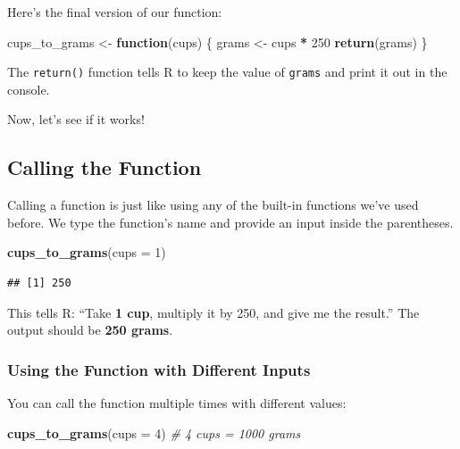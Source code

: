 \documentclass[
]{book}
\newenvironment{Shaded}{\begin{snugshade}}{\end{snugshade}}
\newcommand{\AttributeTok}[1]{\textcolor[rgb]{0.13,0.29,0.53}{#1}}
\newcommand{\CommentTok}[1]{\textcolor[rgb]{0.56,0.35,0.01}{\textit{#1}}}
\newcommand{\ControlFlowTok}[1]{\textcolor[rgb]{0.13,0.29,0.53}{\textbf{#1}}}
\newcommand{\DecValTok}[1]{\textcolor[rgb]{0.00,0.00,0.81}{#1}}
\newcommand{\FunctionTok}[1]{\textcolor[rgb]{0.13,0.29,0.53}{\textbf{#1}}}
\newcommand{\NormalTok}[1]{#1}
\newcommand{\OtherTok}[1]{\textcolor[rgb]{0.56,0.35,0.01}{#1}}
\newcommand{\SpecialCharTok}[1]{\textcolor[rgb]{0.81,0.36,0.00}{\textbf{#1}}}
\begin{document}
Here's the final version of our function:

\begin{Shaded}
\begin{Highlighting}[]
\NormalTok{cups\_to\_grams }\OtherTok{\textless{}{-}} \ControlFlowTok{function}\NormalTok{(cups) \{}
\NormalTok{  grams }\OtherTok{\textless{}{-}}\NormalTok{ cups }\SpecialCharTok{*} \DecValTok{250}
  \FunctionTok{return}\NormalTok{(grams)}
\NormalTok{\}}
\end{Highlighting}
\end{Shaded}

The \texttt{return()} function tells R to keep the value of \texttt{grams} and print it out in the console.

Now, let's see if it works!

\subsection{\texorpdfstring{\textbf{Calling the Function}}{Calling the Function}}\label{calling-the-function}

Calling a function is just like using any of the built-in functions we've used before. We type the function's name and provide an input inside the parentheses.

\begin{Shaded}
\begin{Highlighting}[]
\FunctionTok{cups\_to\_grams}\NormalTok{(}\AttributeTok{cups =} \DecValTok{1}\NormalTok{)}
\end{Highlighting}
\end{Shaded}

\begin{verbatim}
## [1] 250
\end{verbatim}

This tells R: ``Take \textbf{1 cup}, multiply it by 250, and give me the result.'' The output should be \textbf{250 grams}.

\subsubsection{Using the Function with Different Inputs}\label{using-the-function-with-different-inputs}

You can call the function multiple times with different values:

\begin{Shaded}
\begin{Highlighting}[]
\FunctionTok{cups\_to\_grams}\NormalTok{(}\AttributeTok{cups =} \DecValTok{4}\NormalTok{)    }\CommentTok{\# 4 cups = 1000 grams}
\end{Highlighting}
\end{Shaded}
\end{document}
